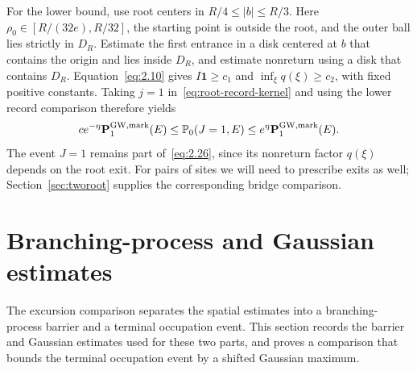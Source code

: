 \documentclass[11pt,a4paper]{article}
\numberwithin{equation}{section}
\theoremstyle{remark}
\begin{document}
For the lower bound, use root centers in $R/4\le|b|\le R/3$. Here $\rho_0\in[R/(32e),R/32]$, the starting point is outside the root, and the outer ball lies strictly in $D_R$. Estimate the first entrance in a disk centered at $b$ that contains the origin and lies inside $D_R$, and estimate nonreturn using a disk that contains $D_R$. Equation~\eqref{eq:2.10} gives $I\mathbf1\ge c_1$ and $\inf_\xi q(\xi)\ge c_2$, with fixed positive constants. Taking $j=1$ in~\eqref{eq:root-record-kernel} and using the lower record comparison therefore yields
\begin{equation}\label{eq:2.26}
c e^{-\eta}\mathbf P_1^{\rm GW,mark}(E)
\le\mathbb P_0(J=1,E)
\le e^\eta\mathbf P_1^{\rm GW,mark}(E).
\end{equation}
The event $J=1$ remains part of~\eqref{eq:2.26}, since its nonreturn factor $q(\xi)$ depends on the root exit. For pairs of sites we will need to prescribe exits as well; Section~\ref{sec:tworoot} supplies the corresponding bridge comparison.



\section{Branching-process and Gaussian estimates}\label{sec:tools}
The excursion comparison separates the spatial estimates into a branching-process barrier and a terminal occupation event. This section records the barrier and Gaussian estimates used for these two parts, and proves a comparison that bounds the terminal occupation event by a shifted Gaussian maximum.
\end{document}
